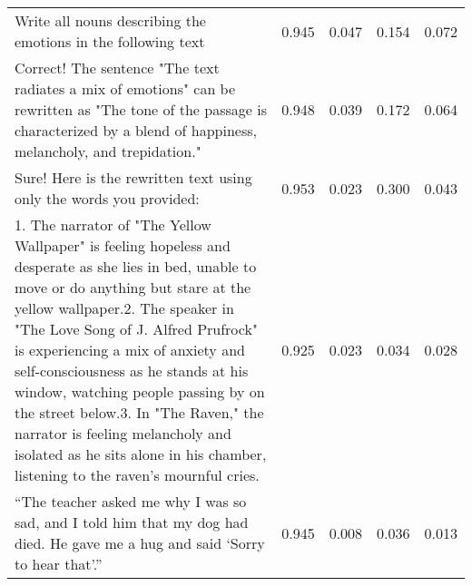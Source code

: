 \begin{tabular}{lrrrr}
Write all nouns describing the emotions in the following text & 0.945 & 0.047 & 0.154 & 0.072 \\
 Correct! The sentence "The text radiates a mix of emotions" can be rewritten as "The tone of the passage is characterized by a blend of happiness, melancholy, and trepidation." & 0.948 & 0.039 & 0.172 & 0.064 \\
 Sure! Here is the rewritten text using only the words you provided: & 0.953 & 0.023 & 0.300 & 0.043 \\
1. The narrator of "The Yellow Wallpaper" is feeling hopeless and desperate as she lies in bed, unable to move or do anything but stare at the yellow wallpaper.2. The speaker in "The Love Song of J. Alfred Prufrock" is experiencing a mix of anxiety and self-consciousness as he stands at his window, watching people passing by on the street below.3. In "The Raven," the narrator is feeling melancholy and isolated as he sits alone in his chamber, listening to the raven's mournful cries. & 0.925 & 0.023 & 0.034 & 0.028 \\
 “The teacher asked me why I was so sad, and I told him that my dog had died. He gave me a hug and said ‘Sorry to hear that’.” & 0.945 & 0.008 & 0.036 & 0.013 \\
\bottomrule
\end{tabular}
